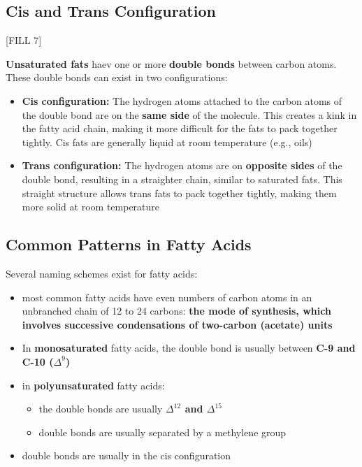 \documentclass[10pt]{article}
\begin{document}
\subsection*{Cis and Trans Configuration}
\begin{center}
    [FILL 7]
\end{center}
\textbf{Unsaturated fats} haev one or more \textbf{double bonds} between carbon atoms.  These double bonds can exist in two configurations:
\begin{itemize}
    \item \textbf{Cis configuration:} The hydrogen atoms attached to the carbon atoms of the double bond are on the \textbf{same side} of the molecule.  This creates a kink in the fatty acid chain, making it more difficult for the fats to pack together tightly.  Cis fats are generally liquid at room temperature (e.g., oils)
    \item \textbf{Trans configuration:} The hydrogen atoms are on \textbf{opposite sides} of the double bond, resulting in a straighter chain, similar to saturated fats.  This straight structure allows trans fats to pack together tightly, making them more solid at room temperature
\end{itemize}

\subsection*{Common Patterns in Fatty Acids}
Several naming schemes exist for fatty acids:
\begin{itemize}
    \item most common fatty acids have even numbers of carbon atoms in an unbranched chain of 12 to 24 carbons: \textbf{the mode of synthesis, which involves successive condensations of two-carbon (acetate) units}
    \item In \textbf{monosaturated} fatty acids, the double bond is usually between \textbf{C-9 and C-10 ($\Delta^9$)}
    \item in \textbf{polyunsaturated} fatty acids:
    \begin{itemize}
        \item the double bonds are usually \textbf{$\Delta^{12}$ and $\Delta^{15}$}
        \item double bonds are usually separated by a methylene group
    \end{itemize}
    \item double bonds are usually in the cis configuration
\end{itemize}
\end{document}
